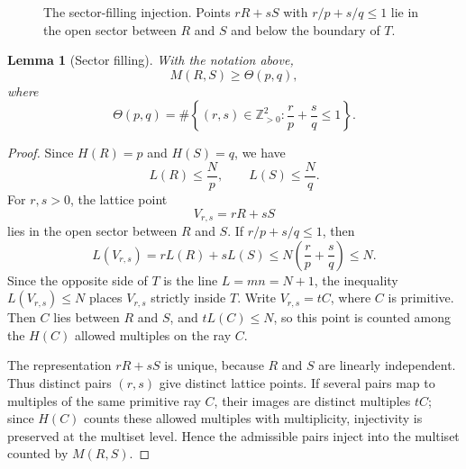\documentclass[11pt]{article}
\newtheorem{lemma}[theorem]{Lemma}
\newcommand{\Z}{\mathbb Z}
\begin{document}
\begin{figure}[t]
\centering
{}
\caption{The sector-filling injection.  Points $rR+sS$ with $r/p+s/q\le1$ lie in the open sector between $R$ and $S$ and below the boundary of $T$.}
\label{fig:sector-filling}
\end{figure}

\begin{lemma}[Sector filling]\label{lem:sector-filling}
With the notation above,
\[
        M(R,S)
        \ge
        \Theta(p,q),
\]
where
\[
        \Theta(p,q)=
        \#\left\{(r,s)\in\Z_{>0}^2:
        \frac rp+\frac sq\le1\right\}.
\]
\end{lemma}

\begin{proof}
Since $H(R)=p$ and $H(S)=q$, we have
\[
        L(R)\le \frac Np,
        \qquad
        L(S)\le \frac Nq.
\]
For $r,s>0$, the lattice point
\[
        V_{r,s}=rR+sS
\]
lies in the open sector between $R$ and $S$.  If $r/p+s/q\le1$, then
\[
        L(V_{r,s})=rL(R)+sL(S)
        \le
        N\left(\frac rp+\frac sq\right)
        \le N.
\]
Since the opposite side of $T$ is the line $L=mn=N+1$, the inequality $L(V_{r,s})\le N$ places $V_{r,s}$ strictly inside $T$.  Write $V_{r,s}=tC$, where $C$ is primitive.  Then $C$ lies between $R$ and $S$, and $tL(C)\le N$, so this point is counted among the $H(C)$ allowed multiples on the ray $C$.

The representation $rR+sS$ is unique, because $R$ and $S$ are linearly independent.  Thus distinct pairs $(r,s)$ give distinct lattice points.  If several pairs map to multiples of the same primitive ray $C$, their images are distinct multiples $tC$; since $H(C)$ counts these allowed multiples with multiplicity, injectivity is preserved at the multiset level.  Hence the admissible pairs inject into the multiset counted by $M(R,S)$.
\end{proof}
\end{document}

